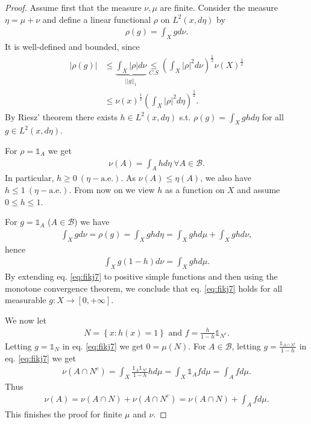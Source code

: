 \begin{proof}
    Assume first that the measure \(\nu,\mu\) are finite. Consider the measure \(\eta = \mu+\nu\) and define a linear functional \(\rho\)
    on \(L^2(x,d\eta)\) by
    \begin{align*}
        \rho(g) = \int_X gd\nu.
    \end{align*}
    It is well-defined and bounded, since 
    \begin{align*}
        |\rho(g)| &\leq \underbrace{\int_X|\rho|d\nu}_{||g||_1} \underset{C.S}{\leq} (\int_X |\rho|^2 d\nu)^{\frac{1}{2}} \nu(X)^{\frac{1}{2}} \\
        &\leq \nu(x)^{\frac{1}{2}} (\int_X |\rho|^2 d\eta)^{\frac{1}{2}}.
    \end{align*}
    By Riesz' theorem there exists \(h\in L^2(x,d\eta)\) s.t. \(\rho(g)=\int_X g h d\eta\) for all \(g\in L^2(x,d\eta)\). 

    For \(\rho = \mathds{1}_A\) we get
    \begin{align*}
        \nu(A) = \int_A h d\eta \ \forall A\in\mathscr{B}.
    \end{align*}
    In particular, \(h\geq 0 \ (\eta-\text{a.e.})\). As \(\nu(A) \leq \eta(A)\), we also have \(h\leq 1 \ (\eta-\text{a.e.})\). From now on
    we view \(h\) as a function on \(X\) and assume \(0\leq h\leq 1\).

    For \(g=\mathds{1}_A\) (\(A\in\mathscr{B}\)) we have 
    \begin{align*}
        \int_Xg d\nu = \rho(g) = \int_X ghd\eta = \int_X gh d\mu + \int_X ghd\nu,
    \end{align*}
    hence
    \begin{align}   \label{eq:fikj7}
        \int_Xg(1-h)d\nu = \int_X ghd\mu.
    \end{align}
    By extending eq. \ref{eq:fikj7} to positive simple functions and then using the monotone convergence theorem, we conclude that 
    eq. \ref{eq:fikj7} holds for all measurable \(g:X\rightarrow [0,+\infty]\).

    We now let
    \begin{align*}
        N = \left\{ x : h(x) = 1\right\} \text{ and } f = \frac{h}{1 - h}\mathds{1}_{N^c}.
    \end{align*}
    Letting \(g=\mathds{1}_N\) in eq. \ref{eq:fikj7} we get \(0=\mu(N)\). For \(A\in\mathscr{B}\), letting 
    \(g = \frac{\mathds{1}_{A\cap N^c}}{1-h}\) in eq. \ref{eq:fikj7} we get
    \begin{align*}
        \nu\left(A\cap N^c\right) = \int_X \frac{\mathds{1}_A \mathds{1}_{N^c}}{1-h}hd\mu = \int_X \mathds{1}_A fd\mu = \int_A fd\mu.
    \end{align*}
    Thus
    \begin{align*}
        \nu(A) = \nu\left(A\cap N\right) + \nu\left(A\cap N^c\right) = \nu\left(A\cap N\right) + \int_A fd\mu.
    \end{align*}
    This finishes the proof for finite \(\mu\) and \(\nu\).


\end{proof}
